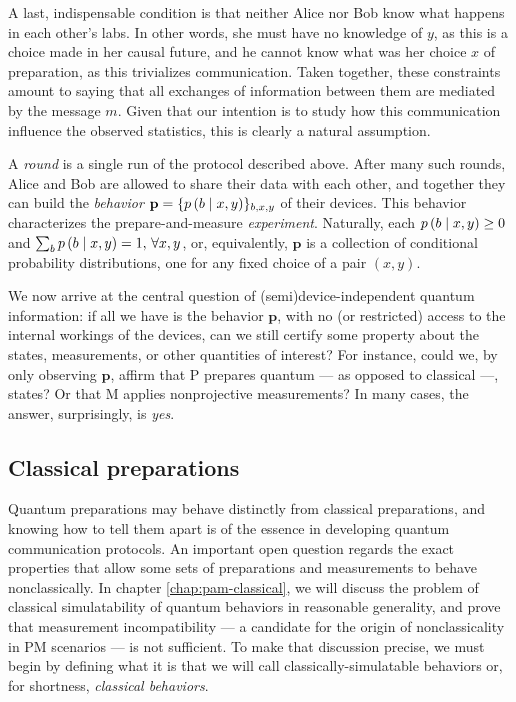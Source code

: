         A last, indispensable condition is that neither Alice nor Bob know what happens in each other's labs. In other words, she must have no knowledge of $y$, as this is a choice made in her causal future, and he cannot know what was her choice $x$ of preparation, as this trivializes communication. Taken together, these constraints amount to saying that all exchanges of information between them are mediated by the message $m$. Given that our intention is to study how this communication influence the observed statistics, this is clearly a natural assumption.
        
        A \emph{round} is a single run of the protocol described above. After many such rounds, Alice and Bob are allowed to share their data with each other, and together they can build the \emph{behavior} $\mathbf{p} = \{ p \left( b \mid x,y \right) \}_{b,x,y}$ of their devices. This behavior characterizes the prepare-and-measure \emph{experiment}. Naturally, each $p \left( b \mid x,y \right) \geq 0$ and $\sum_b p \left( b \mid x,y \right) = 1, \,\forall x,y$, or, equivalently, $\mathbf{p}$ is a collection of conditional probability distributions, one for any fixed choice of a pair $(x,y)$.
        
        We now arrive at the central question of (semi)device-independent quantum information: if all we have is the behavior $\mathbf{p}$, with no (or restricted) access to the internal workings of the devices, can we still certify some property about the states, measurements, or other quantities of interest? For instance, could we, by only observing $\mathbf{p}$, affirm that P prepares quantum --- as opposed to classical ---, states? Or that M applies nonprojective measurements? In many cases, the answer, surprisingly, is \emph{yes}.
    
        \subsection{Classical preparations}
        \label{sec:classical-behaviors}

            Quantum preparations may behave distinctly from classical preparations, and knowing how to tell them apart is of the essence in developing quantum communication protocols. An important open question regards the exact properties that allow some sets of preparations and measurements to behave nonclassically. In chapter \ref{chap:pam-classical}, we will discuss the problem of classical simulatability of quantum behaviors in reasonable generality, and prove that measurement incompatibility --- a candidate for the origin of nonclassicality in PM scenarios --- is not sufficient. To make that discussion precise, we must begin by defining what it is that we will call classically-simulatable behaviors or, for shortness, \emph{classical behaviors}.
        
